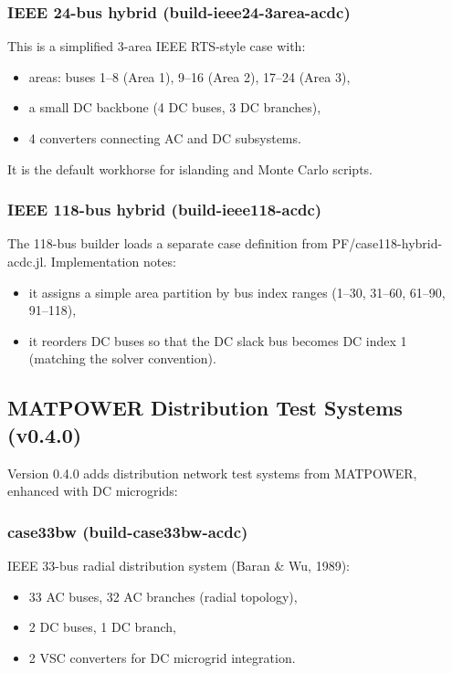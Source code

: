 \documentclass[11pt]{article}
\def\code#1{#1}%
\def\file#1{#1}%
\def\_{-}%
\newcommand{\code}[1]{\nolinkurl{#1}}
\newcommand{\file}[1]{\path{#1}}
\begin{document}
\subsubsection{IEEE 24-bus hybrid (\code{build\_ieee24\_3area\_acdc})}
This is a simplified 3-area IEEE RTS-style case with:
\begin{itemize}[leftmargin=*]
  \item areas: buses 1--8 (Area 1), 9--16 (Area 2), 17--24 (Area 3),
  \item a small DC backbone (4 DC buses, 3 DC branches),
  \item 4 converters connecting AC and DC subsystems.
\end{itemize}
It is the default workhorse for islanding and Monte Carlo scripts.

\subsubsection{IEEE 118-bus hybrid (\code{build\_ieee118\_acdc})}
The 118-bus builder loads a separate case definition from \file{PF/case118\_hybrid\_acdc.jl}. Implementation notes:
\begin{itemize}[leftmargin=*]
  \item it assigns a simple area partition by bus index ranges (1--30, 31--60, 61--90, 91--118),
  \item it reorders DC buses so that the DC slack bus becomes DC index 1 (matching the solver convention).
\end{itemize}

\subsection{MATPOWER Distribution Test Systems (v0.4.0)}

Version 0.4.0 adds distribution network test systems from MATPOWER, enhanced with DC microgrids:

\subsubsection{case33bw (\code{build\_case33bw\_acdc})}
IEEE 33-bus radial distribution system (Baran \& Wu, 1989):
\begin{itemize}[leftmargin=*]
  \item 33 AC buses, 32 AC branches (radial topology),
  \item 2 DC buses, 1 DC branch,
  \item 2 VSC converters for DC microgrid integration.
\end{itemize}
\end{document}

